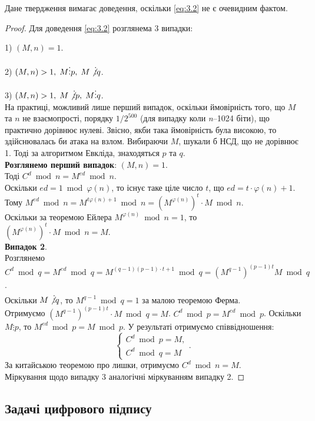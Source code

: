 Дане твердження вимагає доведення, оскільки \eqref{eq:3.2} не є очевидним фактом.
\begin{proof}
Для доведення \eqref{eq:3.2} розглянема 3 випадки:
\par1) $(M,n) = 1$.
\par2) $(M,n) > 1, \; M \vdots p, \; M\not\vdots q$.
\par3) $(M,n) > 1, \; M\not \vdots p, \; M \vdots q$.
\\
На практиці, можливий лише перший випадок, оскільки ймовірність того, що $M$ та $n$ не взаємопрості, порядку $1/2^{500}$ (для випадку коли \textsl{n}--1024 біти), що практично дорівнює нулеві.
Звісно, якби така ймовірність була високою, то здійснювалась би атака на взлом. Вибираючи $M$, шукали б НСД, що не дорівнює 1. Тоді за алгоритмом Евкліда, знаходяться $p$ та $q$.\\ 
\textbf{Розглянемо перший випадок}: $(M,n) = 1$. \\
Тоді $C ^ d \bmod n = M ^ {ed} \bmod n$. \\
Оскільки $ed = 1 \bmod \varphi (n)$, то існує таке ціле число $t$, що $ed = t \cdot \varphi (n) + 1 $. \\
Тому $M ^ {ed} \bmod n = M ^ {t \varphi (n) + 1} \bmod n = (M ^ {\varphi (n)}) ^ t \cdot M \bmod n$.\\
 Оскільки за теоремою Ейлера $M ^ {\varphi (n)} \bmod n = 1$, то $(M ^ {\varphi (n)}) ^ t \cdot M \bmod n = M$.\\
\textbf{Випадок 2}.\\
 Розглянемо $C ^ d \bmod q = M ^ {ed} \bmod q = M ^ {(q-1)(p-1) \cdot t + 1} \bmod q = (M ^ {q-1}) ^ {(p-1)t}M \bmod q$.\\ Оскільки $M \not\vdots q$, то $M ^ {q-1} \bmod q = 1$ за малою теоремою Ферма. \\
Отримуємо $(M ^ {q-1}) ^ {(p-1)t} \cdot M \bmod q = M$. $C ^ d \bmod p = M ^{ed} \bmod p$. Оскільки $M \vdots p$, то $M ^{ed} \bmod p = M \bmod p$. У результаті отримуємо співвідношення:
\begin{equation*}
\begin{cases}
    C ^ d \bmod p = M, \\
    C ^ d \bmod q = M
\end{cases}.
\end{equation*}
За китайською теоремою про лишки, отримуємо $C ^ d \bmod n = M$.\\
Міркування щодо випадку 3 аналогічні міркуванням випадку 2.
\end{proof}

\subsection{Задачі цифрового підпису}

